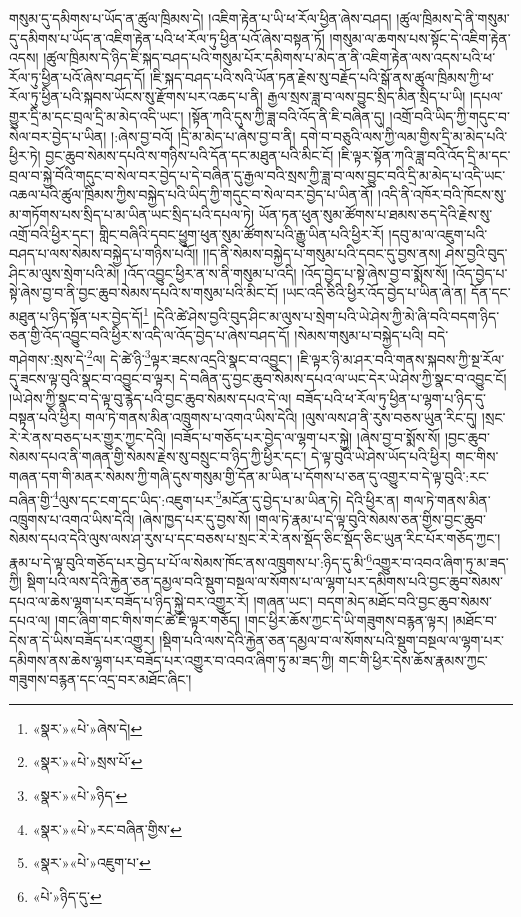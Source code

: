 གསུམ་དུ་དམིགས་པ་ཡོད་ན་ཚུལ་ཁྲིམས་དེ། །འཇིག་རྟེན་པ་ཡི་ཕ་རོལ་ཕྱིན་ཞེས་བཤད། །ཚུལ་ཁྲིམས་དེ་ནི་གསུམ་དུ་དམིགས་པ་ཡོད་ན་འཇིག་རྟེན་པའི་ཕ་རོལ་ཏུ་ཕྱིན་པའོ་ཞེས་བསྟན་ཏོ། །གསུམ་ལ་ཆགས་པས་སྟོང་དེ་འཇིག་རྟེན་འདས། །ཚུལ་ཁྲིམས་དེ་ཉིད་ཇི་སྐད་བཤད་པའི་གསུམ་པོར་དམིགས་པ་མེད་ན་ནི་འཇིག་རྟེན་ལས་འདས་པའི་ཕ་རོལ་ཏུ་ཕྱིན་པའོ་ཞེས་བཤད་དོ། །ཇི་སྐད་བཤད་པའི་སའི་ཡོན་ཏན་རྗེས་སུ་བརྗོད་པའི་སྒོ་ནས་ཚུལ་ཁྲིམས་ཀྱི་ཕ་རོལ་ཏུ་ཕྱིན་པའི་སྐབས་ཡོངས་སུ་རྫོགས་པར་འཆད་པ་ནི། རྒྱལ་སྲས་ཟླ་བ་ལས་བྱུང་སྲིད་མིན་སྲིད་པ་ཡི། །དཔལ་གྱུར་དྲི་མ་དང་བྲལ་དྲི་མ་མེད་འདི་ཡང་། །སྟོན་ཀའི་དུས་ཀྱི་ཟླ་བའི་འོད་ནི་ཇི་བཞིན་དུ། །འགྲོ་བའི་ཡིད་ཀྱི་གདུང་བ་སེལ་བར་བྱེད་པ་ཡིན། །:ཞེས་བྱ་བའོ། །དྲི་མ་མེད་པ་ཞེས་བྱ་བ་ནི། དགེ་བ་བཅུའི་ལས་ཀྱི་ལམ་གྱིས་དྲི་མ་མེད་པའི་ཕྱིར་ཏེ། བྱང་ཆུབ་སེམས་དཔའི་ས་གཉིས་པའི་དོན་དང་མཐུན་པའི་མིང་ངོ། །ཇི་ལྟར་སྟོན་ཀའི་ཟླ་བའི་འོད་དྲི་མ་དང་བྲལ་བ་སྐྱེ་བོའི་གདུང་བ་སེལ་བར་བྱེད་པ་དེ་བཞིན་དུ་རྒྱལ་བའི་སྲས་ཀྱི་ཟླ་བ་ལས་བྱུང་བའི་དྲི་མ་མེད་པ་འདི་ཡང་འཆལ་པའི་ཚུལ་ཁྲིམས་ཀྱིས་བསྐྱེད་པའི་ཡིད་ཀྱི་གདུང་བ་སེལ་བར་བྱེད་པ་ཡིན་ནོ། །འདི་ནི་འཁོར་བའི་ཁོངས་སུ་མ་གཏོགས་པས་སྲིད་པ་མ་ཡིན་ཡང་སྲིད་པའི་དཔལ་ཏེ། ཡོན་ཏན་ཕུན་སུམ་ཚོགས་པ་ཐམས་ཅད་དེའི་རྗེས་སུ་འགྲོ་བའི་ཕྱིར་དང་། གླིང་བཞིའི་དབང་ཕྱུག་ཕུན་སུམ་ཚོགས་པའི་རྒྱུ་ཡིན་པའི་ཕྱིར་རོ། །དབུ་མ་ལ་འཇུག་པའི་བཤད་པ་ལས་སེམས་བསྐྱེད་པ་གཉིས་པའོ།། །།ད་ནི་སེམས་བསྐྱེད་པ་གསུམ་པའི་དབང་དུ་བྱས་ནས། ཤེས་བྱའི་བུད་ཤིང་མ་ལུས་སྲེག་པའི་མེ། །འོད་འབྱུང་ཕྱིར་ན་ས་ནི་གསུམ་པ་འདི། །འོད་བྱེད་པ་སྟེ་ཞེས་བྱ་བ་སྨོས་སོ། །འོད་བྱེད་པ་སྟེ་ཞེས་བྱ་བ་ནི་བྱང་ཆུབ་སེམས་དཔའི་ས་གསུམ་པའི་མིང་ངོ། །ཡང་འདི་ཅིའི་ཕྱིར་འོད་བྱེད་པ་ཡིན་ཞེ་ན། དོན་དང་མཐུན་པ་ཉིད་སྟོན་པར་བྱེད་དོ།\footnote{«སྣར་»«པེ་»ཞེས་དེ།} །དེའི་ཚེ་ཤེས་བྱའི་བུད་ཤིང་མ་ལུས་པ་སྲེག་པའི་ཡེ་ཤེས་ཀྱི་མེ་ཞི་བའི་བདག་ཉིད་ཅན་གྱི་འོད་འབྱུང་བའི་ཕྱིར་ས་འདི་ལ་འོད་བྱེད་པ་ཞེས་བཤད་དོ། །སེམས་གསུམ་པ་བསྐྱེད་པའི། བདེ་གཤེགས་:སྲས་དེ་\footnote{«སྣར་»«པེ་»སྲས་པོ་}ལ། དེ་ཚེ་ཉི་\footnote{«སྣར་»«པེ་»ཉིད་}ལྟར་ཟངས་འདྲའི་སྣང་བ་འབྱུང་། །ཇི་ལྟར་ཉི་མ་ཤར་བའི་གནས་སྐབས་ཀྱི་སྔ་རོལ་དུ་ཟངས་ལྟ་བུའི་སྣང་བ་འབྱུང་བ་ལྟར། དེ་བཞིན་དུ་བྱང་ཆུབ་སེམས་དཔའ་ལ་ཡང་དེར་ཡེ་ཤེས་ཀྱི་སྣང་བ་འབྱུང་ངོ། །ཡེ་ཤེས་ཀྱི་སྣང་བ་དེ་ལྟ་བུ་རྙེད་པའི་བྱང་ཆུབ་སེམས་དཔའ་དེ་ལ། བཟོད་པའི་ཕ་རོལ་ཏུ་ཕྱིན་པ་ལྷག་པ་ཉིད་དུ་བསྟན་པའི་ཕྱིར། གལ་ཏེ་གནས་མིན་འཁྲུགས་པ་འགའ་ཡིས་དེའི། །ལུས་ལས་ཤ་ནི་རུས་བཅས་ཡུན་རིང་དུ། །སྲང་རེ་རེ་ནས་བཅད་པར་གྱུར་ཀྱང་དེའི། །བཟོད་པ་གཅོད་པར་བྱེད་ལ་ལྷག་པར་སྐྱེ། །ཞེས་བྱ་བ་སྨོས་སོ། །བྱང་ཆུབ་སེམས་དཔའ་ནི་གཞན་གྱི་སེམས་རྗེས་སུ་བསྲུང་བ་ཉིད་ཀྱི་ཕྱིར་དང་། དེ་ལྟ་བུའི་ཡེ་ཤེས་ཡོད་པའི་ཕྱིར། གང་གིས་གཞན་དག་གི་མནར་སེམས་ཀྱི་གཞི་དུས་གསུམ་གྱི་དོན་མ་ཡིན་པ་དོགས་པ་ཅན་དུ་འགྱུར་བ་དེ་ལྟ་བུའི་:རང་བཞིན་གྱི་\footnote{«སྣར་»«པེ་»རང་བཞིན་གྱིས་}ལུས་དང་ངག་དང་ཡིད་:འཇུག་པར་\footnote{«སྣར་»«པེ་»འཇུག་པ་}མངོན་དུ་བྱེད་པ་མ་ཡིན་ཏེ། དེའི་ཕྱིར་ན། གལ་ཏེ་གནས་མིན་འཁྲུགས་པ་འགའ་ཡིས་དེའི། །ཞེས་ཁྱད་པར་དུ་བྱས་སོ། །གལ་ཏེ་རྣམ་པ་དེ་ལྟ་བུའི་སེམས་ཅན་གྱིས་བྱང་ཆུབ་སེམས་དཔའ་དེའི་ལུས་ལས་ཤ་རུས་པ་དང་བཅས་པ་སྲང་རེ་རེ་ནས་སྡོད་ཅིང་སྡོད་ཅིང་ཡུན་རིང་པོར་གཅོད་ཀྱང་། རྣམ་པ་དེ་ལྟ་བུའི་གཅོད་པར་བྱེད་པ་པོ་ལ་སེམས་ཁོང་ནས་འཁྲུགས་པ་:ཉིད་དུ་མི་\footnote{«པེ་»ཉིད་དུ་}འགྱུར་བ་འབའ་ཞིག་ཏུ་མ་ཟད་ཀྱི། སྡིག་པའི་ལས་དེའི་རྐྱེན་ཅན་དམྱལ་བའི་སྡུག་བསྔལ་ལ་སོགས་པ་ལ་ལྷག་པར་དམིགས་པའི་བྱང་ཆུབ་སེམས་དཔའ་ལ་ཆེས་ལྷག་པར་བཟོད་པ་ཉིད་སྐྱེ་བར་འགྱུར་རོ། །གཞན་ཡང་། བདག་མེད་མཐོང་བའི་བྱང་ཆུབ་སེམས་དཔའ་ལ། །གང་ཞིག་གང་གིས་གང་ཚེ་ཇི་ལྟར་གཅོད། །གང་ཕྱིར་ཆོས་ཀྱང་དེ་ཡི་གཟུགས་བརྙན་ལྟར། །མཐོང་བ་དེས་ན་དེ་ཡིས་བཟོད་པར་འགྱུར། །སྡིག་པའི་ལས་དེའི་རྐྱེན་ཅན་དམྱལ་བ་ལ་སོགས་པའི་སྡུག་བསྔལ་ལ་ལྷག་པར་དམིགས་ནས་ཆེས་ལྷག་པར་བཟོད་པར་འགྱུར་བ་འབའ་ཞིག་ཏུ་མ་ཟད་ཀྱི། གང་གི་ཕྱིར་དེས་ཆོས་རྣམས་ཀྱང་གཟུགས་བརྙན་དང་འདྲ་བར་མཐོང་ཞིང་། 